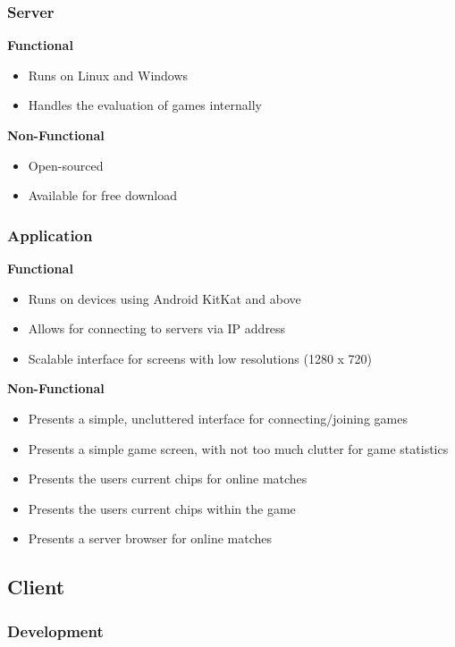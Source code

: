 \documentclass[11pt]{article}
\begin{document}
\subsubsection{Server}
\textbf{Functional}
\begin{itemize}
	\item Runs on Linux and Windows
	\item Handles the evaluation of games internally
\end{itemize}

\textbf{Non-Functional}
\begin{itemize}
	\item Open-sourced
	\item Available for free download
\end{itemize}

\subsubsection{Application}

\textbf{Functional}
\begin{itemize}
	\item Runs on devices using Android KitKat and above
	\item Allows for connecting to servers via IP address
	\item Scalable interface for screens with low resolutions (1280 x 720)
\end{itemize}

\textbf{Non-Functional}
\begin{itemize}
	\item Presents a simple, uncluttered interface for connecting/joining games
	\item Presents a simple game screen, with not too much clutter for game statistics
	\item Presents the users current chips for online matches
	\item Presents the users current chips within the game
	\item Presents a server browser for online matches
\end{itemize}

\newpage



\subsection{Client}
\subsubsection{Development}
\end{document}
